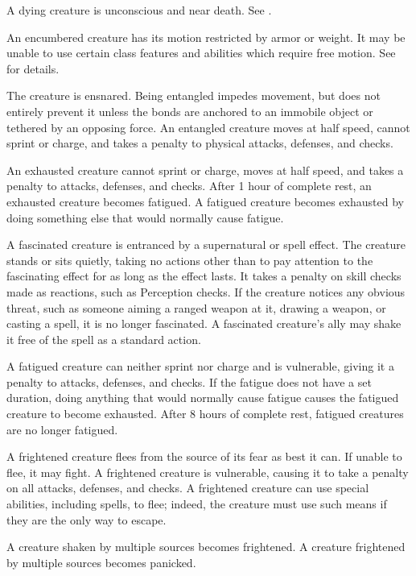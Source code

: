  A dying creature is unconscious and near death. See .

 An encumbered creature has its motion restricted by armor or weight. It may be unable to use certain class features and abilities which require free motion. See  for details.

 The creature is ensnared. Being entangled impedes movement, but does not entirely prevent it unless the bonds are anchored to an immobile object or tethered by an opposing force. An entangled creature moves at half speed, cannot sprint or charge, and takes a  penalty to physical attacks, defenses, and checks.

 An exhausted creature cannot sprint or charge, moves at half speed, and takes a  penalty to attacks, defenses, and checks. After 1 hour of complete rest, an exhausted creature becomes fatigued. A fatigued creature becomes exhausted by doing something else that would normally cause fatigue.

 A fascinated creature is entranced by a supernatural or spell effect. The creature stands or sits quietly, taking no actions other than to pay attention to the fascinating effect for as long as the effect lasts. It takes a  penalty on skill checks made as reactions, such as Perception checks. If the creature notices any obvious threat, such as someone aiming a ranged weapon at it, drawing a weapon, or casting a spell, it is no longer fascinated. A fascinated creature's ally may shake it free of the spell as a standard action.

 A fatigued creature can neither sprint nor charge and is vulnerable, giving it a  penalty to attacks, defenses, and checks. If the fatigue does not have a set duration, doing anything that would normally cause fatigue causes the fatigued creature to become exhausted. After 8 hours of complete rest, fatigued creatures are no longer fatigued.

 A frightened creature flees from the source of its fear as best it can. If unable to flee, it may fight. A frightened creature is vulnerable, causing it to take a  penalty on all attacks, defenses, and checks. A frightened creature can use special abilities, including spells, to flee; indeed, the creature must use such means if they are the only way to escape.

A creature shaken by multiple sources becomes frightened. A creature frightened by multiple sources becomes panicked.


